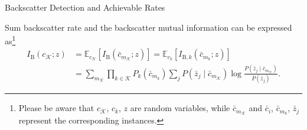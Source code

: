 \documentclass[journal]{IEEEtran}
\begin{document}
\begin{section}{Backscatter Detection and Achievable Rates}
\begin{subsection}{Sum backscatter rate}
			and the backscatter mutual information can be expressed as\footnote{Please be aware that $c_{\mathcal{K}}$, $c_k$, $z$ are random variables, while $\bar{c}_{m_{\mathcal{K}}}$ and $\bar{c}_i$, $\bar{c}_{m_k}$, $\bar{z}_j$ represent the corresponding instances.}
			\begin{subequations}
				\begin{align}
					I_{\mathrm{B}}(c_{\mathcal{K}};z)
					& = \mathbb{E}_{c_{\mathcal{K}}} \left[I_{\mathrm{B}}(\bar{c}_{m_{\mathcal{K}}};z)\right] = \mathbb{E}_{c_k} \left[I_{\mathrm{B},k}(\bar{c}_{m_k};z)\right]\label{eq:backscatter_sum_rate_expectation}\\
					& = \sum_{m_{\mathcal{K}}} \prod_{k \in \mathcal{K}} P_k(\bar{c}_{m_k}) \sum_j P(\bar{z}_j \mid \bar{c}_{m_{\mathcal{K}}}) \log \frac{P(\bar{z}_j \mid \bar{c}_{m_{\mathcal{K}}})}{P(\bar{z}_j)}.\label{eq:backscatter_sum_rate_expansion}

\end{align}
\end{subequations}
\end{subsection}
\end{section}
\end{document}
